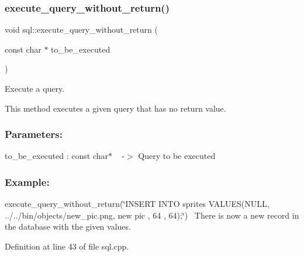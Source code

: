 \subsubsection{\texorpdfstring{execute\+\_\+query\+\_\+without\+\_\+return()}{execute\_query\_without\_return()}}
{\footnotesize\ttfamily void sql\+::execute\+\_\+query\+\_\+without\+\_\+return (\begin{DoxyParamCaption}\item[{const char $\ast$}]{to\+\_\+be\+\_\+executed }\end{DoxyParamCaption})}



Execute a query. 

This method executes a given query that has no return value.~\newline
 \subsubsection*{Parameters\+: }

to\+\_\+be\+\_\+executed \+: const char$\ast$ ~\newline
-\/$>$ Query to be executed

\subsubsection*{Example\+: }

execute\+\_\+query\+\_\+without\+\_\+return(\char`\"{}\+I\+N\+S\+E\+R\+T I\+N\+T\+O sprites V\+A\+L\+U\+E\+S(\+N\+U\+L\+L, \textquotesingle{}../../bin/objects/new\+\_\+pic.\+png\textquotesingle{}, new pic , 64 , 64);\char`\"{})~\newline
There is now a new record in the database with the given values. 

Definition at line 43 of file sql.\+cpp.

